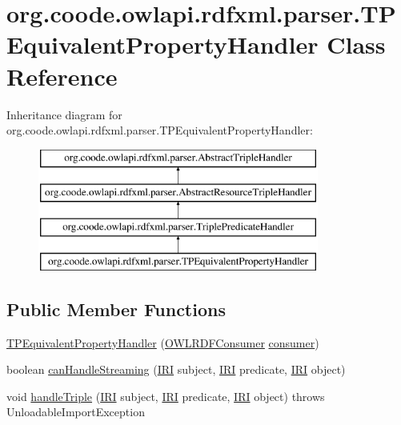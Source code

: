 \hypertarget{classorg_1_1coode_1_1owlapi_1_1rdfxml_1_1parser_1_1_t_p_equivalent_property_handler}{\section{org.\-coode.\-owlapi.\-rdfxml.\-parser.\-T\-P\-Equivalent\-Property\-Handler Class Reference}
\label{classorg_1_1coode_1_1owlapi_1_1rdfxml_1_1parser_1_1_t_p_equivalent_property_handler}
}
Inheritance diagram for org.\-coode.\-owlapi.\-rdfxml.\-parser.\-T\-P\-Equivalent\-Property\-Handler\-:\begin{figure}[H]
\begin{center}
\leavevmode
\includegraphics[height=4.000000cm]{classorg_1_1coode_1_1owlapi_1_1rdfxml_1_1parser_1_1_t_p_equivalent_property_handler}
\end{center}
\end{figure}
\subsection*{Public Member Functions}
\begin{DoxyCompactItemize}
\item 
\hyperlink{classorg_1_1coode_1_1owlapi_1_1rdfxml_1_1parser_1_1_t_p_equivalent_property_handler_a6094c54aa96a1591e2175d2b7a69cedc}{T\-P\-Equivalent\-Property\-Handler} (\hyperlink{classorg_1_1coode_1_1owlapi_1_1rdfxml_1_1parser_1_1_o_w_l_r_d_f_consumer}{O\-W\-L\-R\-D\-F\-Consumer} \hyperlink{classorg_1_1coode_1_1owlapi_1_1rdfxml_1_1parser_1_1_abstract_triple_handler_a4ccf4d898ff01eb1cadfa04b23d54e9c}{consumer})
\item 
boolean \hyperlink{classorg_1_1coode_1_1owlapi_1_1rdfxml_1_1parser_1_1_t_p_equivalent_property_handler_a90c215b3a38ce485315e64fb1c1fa866}{can\-Handle\-Streaming} (\hyperlink{classorg_1_1semanticweb_1_1owlapi_1_1model_1_1_i_r_i}{I\-R\-I} subject, \hyperlink{classorg_1_1semanticweb_1_1owlapi_1_1model_1_1_i_r_i}{I\-R\-I} predicate, \hyperlink{classorg_1_1semanticweb_1_1owlapi_1_1model_1_1_i_r_i}{I\-R\-I} object)
\item 
void \hyperlink{classorg_1_1coode_1_1owlapi_1_1rdfxml_1_1parser_1_1_t_p_equivalent_property_handler_a4c3049fbc8aba3e645f5bb5da9f9ca2c}{handle\-Triple} (\hyperlink{classorg_1_1semanticweb_1_1owlapi_1_1model_1_1_i_r_i}{I\-R\-I} subject, \hyperlink{classorg_1_1semanticweb_1_1owlapi_1_1model_1_1_i_r_i}{I\-R\-I} predicate, \hyperlink{classorg_1_1semanticweb_1_1owlapi_1_1model_1_1_i_r_i}{I\-R\-I} object)  throws Unloadable\-Import\-Exception 
\end{DoxyCompactItemize}
